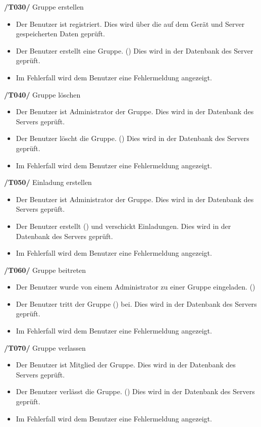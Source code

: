 \begin{itemize}
\begin{itemize}
\begin{itemize}
\begin{itemize}
\textbf{/T030/} Gruppe erstellen \\
\begin{itemize}
\setlength{\itemsep}{0pt}
\item Der Benutzer ist registriert. Dies wird über die auf dem Gerät
und Server gespeicherten Daten geprüft.
\item Der Benutzer erstellt eine Gruppe. () Dies wird in der Datenbank des Server geprüft.
\item Im Fehlerfall wird dem Benutzer eine Fehlermeldung angezeigt.
\end{itemize}

\textbf{/T040/} Gruppe löschen \\
\begin{itemize}
\setlength{\itemsep}{0pt}
\item Der Benutzer ist Administrator der Gruppe. Dies wird in der Datenbank des Servers geprüft.
\item Der Benutzer löscht die Gruppe. () Dies wird in der Datenbank des Servers geprüft.
\item Im Fehlerfall wird dem Benutzer eine Fehlermeldung angezeigt.
\end{itemize}

\textbf{/T050/} Einladung erstellen \\
\begin{itemize}
\setlength{\itemsep}{0pt}
\item Der Benutzer ist Administrator der Gruppe. Dies wird in der Datenbank des Servers geprüft.
\item Der Benutzer erstellt () und verschickt Einladungen. Dies wird in der Datenbank des Servers geprüft.
\item Im Fehlerfall wird dem Benutzer eine Fehlermeldung angezeigt.
\end{itemize}


\textbf{/T060/} Gruppe beitreten \\
\begin{itemize}
\setlength{\itemsep}{0pt}
\item Der Benutzer wurde von einem Administrator zu einer Gruppe eingeladen. ()
\item Der Benutzer tritt der Gruppe () bei. Dies wird in der Datenbank des Servers geprüft.
\item Im Fehlerfall wird dem Benutzer eine Fehlermeldung angezeigt.
\end{itemize}


\textbf{/T070/} Gruppe verlassen \\
\begin{itemize}
\setlength{\itemsep}{0pt}
\item Der Benutzer ist Mitglied der Gruppe. Dies wird in der Datenbank des Servers geprüft.
\item Der Benutzer verlässt die Gruppe. () Dies wird in der Datenbank des Servers geprüft.
\item Im Fehlerfall wird dem Benutzer eine Fehlermeldung angezeigt.
\end{itemize}



\end{itemize}
\end{itemize}
\end{itemize}
\end{itemize}
